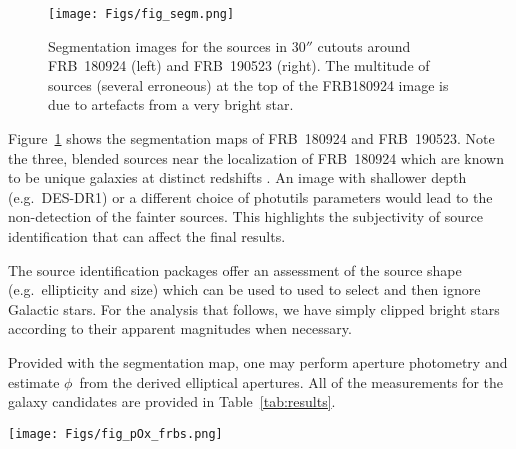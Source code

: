 \documentclass[twocolumn,linenumbers]{aastex63}
\newcommand{\nsecure}{nine}  %
\newcommand{\mhalflight}{\phi} %
\newcommand{\halflight}{$\mhalflight$}
\newcommand{\aimage}{\texttt{a\_image}}
\newcommand{\mPOix}{P(O_i|x)}  %
\newcommand{\POix}{$\mPOix$}
\newcommand{\mPUx}{P(U|x)}  %
\newcommand{\PUx}{$\mPUx$}
\newcommand{\mPOsec}{P_{\rm secure}}  %
\newcommand{\POvsec}{0.95}  %
\begin{document}
\begin{figure}[!ht]
\centering
    \texttt{[image: Figs/fig\_segm.png]}
    \caption{
    Segmentation images for the sources in $30''$
    cutouts around FRB~180924 (left) and FRB~190523 (right).
    The multitude of sources (several erroneous) at the 
    top of the FRB180924 image is due to artefacts from a very
    bright star.
    }
	\label{fig:segm}
\end{figure}

Figure~\ref{fig:segm} shows the segmentation maps of
FRB~180924 and FRB~190523.
Note the three, blended sources near the localization of
FRB~180924 which are known to be unique galaxies
at distinct redshifts \citep{Bannister19}.  An image
with shallower depth (e.g.\ DES-DR1) or a different choice
of {\sc photutils} parameters would lead to the non-detection
of the fainter sources. 
This highlights the subjectivity of
source identification that can affect the final results.

The source identification packages offer an assessment of
the source shape (e.g.\ ellipticity and size) which can be used to 
used to select and then ignore Galactic stars.   
For the analysis that follows, we have simply
clipped bright stars according to their apparent
magnitudes when necessary.


Provided with the segmentation map, one may perform aperture
photometry and estimate \halflight\ from the derived
elliptical apertures.  All of the measurements for the 
galaxy candidates are provided
in Table~\ref{tab:results}.

\begin{figure*}[!ht]
\centering
    \texttt{[image: Figs/fig\_pOx\_frbs.png]}
    \caption{
    Posterior probabilities \POix\ for the most likely host (solid bars) and all other
    candidates (open bars) with $\mPOix > \mPOsec = \POvsec$,
    as a function of prior set
    (green = conservative; black=adopted).
    With $\mPOsec = \POvsec$ as the probability for a 
    secure association, there are currently \nsecure\ FRBs 
    satisfying this criterion using the adopted prior set.  
    The non-secure hosts occur for a variety of reasons as
    described in the text.
    }
	\label{fig:POix}
\end{figure*}
\end{document}
